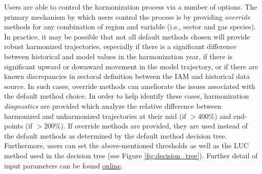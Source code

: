 \documentclass[review]{elsarticle}
\begin{document}
Users are able to control the harmonization process via a number of options. The
primary mechanism by which users control the process is by providing
\textit{override} methods for any combination of region and variable (i.e.,
sector and gas species).  In practice, it may be possible that not all default
methods chosen will provide robust harmonized trajectories, especially if there
is a significant difference between historical and model values in the
harmonization year, if there is significant upward or downward movement in the
model trajectory, or if there are known discrepancies in sectoral definition
between the IAM and historical data source. In such cases, override methods can
ameliorate the issues associated with the default method choice. In order to
help identify these cases, harmonization \textit{diagnostics} are provided which
analyze the relative difference between harmonized and unharmonized trajectories
at their mid (if $> 400$\%) and end-points (if $> 200$\%). If override methods
are provided, they are used instead of the default methods as determined by the
default method decision tree. Furthermore, users can set the above-mentioned
thresholds as well as the LUC method used in the decision tree (see Figure
\ref{fig:decision_tree}). Further detail of input parameters can be found
\href{http://mattgidden.com/aneris/config.html}{online}.
\end{document}
